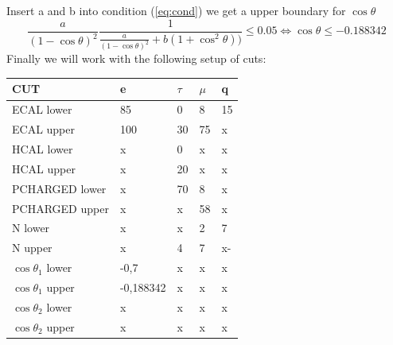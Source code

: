\documentclass[]{article}
\begin{document}
Insert a and b into condition (\ref{eq:cond}) we get a upper boundary for $\cos\theta$
\begin{equation}
\frac{a}{(1-\cos\theta)^2}\frac{1}{\frac{a}{(1-\cos\theta)^2}+b(1+\cos^2\theta))} \leq 0.05 \iff \cos\theta \leq -0.188342
\end{equation}
Finally we will work with the following setup of cuts:
\newline
\begin{tabular}{ |p{3cm}||p{2cm}|p{2cm}|p{2cm}|p{2cm}|  }
 \hline
 CUT & e & $\tau$ & $\mu$ & q \\
 \hline
 ECAL lower & 85 & 0 & 8 & 15 \\
 ECAL upper & 100 & 30 & 75 & x \\
 HCAL lower & x & 0 & x & x \\
 HCAL upper & x & 20 & x & x \\
 PCHARGED lower & x & 70 & 8 & x \\
 PCHARGED upper & x & x & 58 & x \\
 N lower & x & x & 2 & 7 \\
 N upper & x & 4 & 7 &x- \\
 $\cos\theta_1$ lower & -0,7 & x & x & x \\
 $\cos\theta_1$ upper & -0,188342 & x & x & x \\
 $\cos\theta_2$ lower & x & x & x & x \\
 $\cos\theta_2$ upper & x & x & x & x \\
 \hline
\end{tabular}
\newpage
\end{document}
